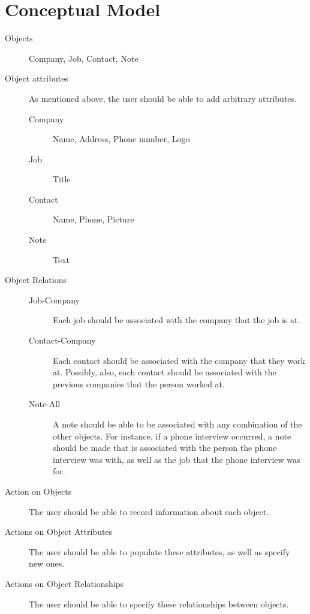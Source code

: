 \documentclass[12pt, letter]{article}
\begin{document}
\section{Conceptual Model}
\begin{description}
\item[Objects] Company, Job, Contact, Note
\item[Object attributes]
As mentioned above, the user should be able to add arbitrary attributes.
\begin{description}
\item[Company] Name, Address, Phone number, Logo
\item[Job] Title
\item[Contact] Name, Phone, Picture
\item[Note] Text
\end{description}

\item[Object Relations] \hfill
\begin{description}
\item[Job-Company] Each job should be associated with the company that the job is at.
\item[Contact-Company] Each contact should be associated with the company that they work at.  Possibly, also, each contact should be associated with the previous companies that the person worked at.
\item[Note-All] A note should be able to be associated with any combination of the other objects.  For instance, if a phone interview occurred, a note should be made that is associated with the person the phone interview was with, as well as the job that the phone interview was for.
\end{description}

\item[Action on Objects] The user should be able to record information about each object.

\item[Actions on Object Attributes] The user should be able to populate these attributes, as well as specify new ones.

\item[Actions on Object Relationships]  The user should be able to specify these relationships between objects.

\end{description}
\end{document}
